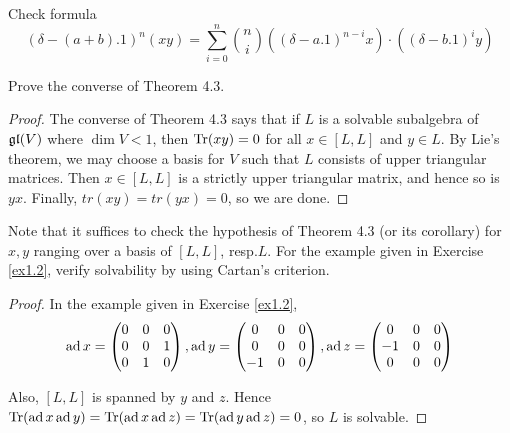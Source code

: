 \begin{ex}
  Check formula
  \begin{equation*}
    (\delta-(a+b).1)^n(xy)=\sum_{i=0}^n \binom{n}{i} ((\delta-a.1)^{n-i}x)\cdot((\delta-b.1)^iy)
  \end{equation*}
\end{ex}

\begin{ex}\label{4.7}
  Prove the converse of Theorem 4.3.
\end{ex}
\begin{proof}
  The converse of Theorem 4.3 says that if $L$ is a solvable subalgebra of $\mathfrak{g}\mathfrak{l}(V)$ where $\dim V < 1$, then $\operatorname{Tr}(xy) = 0$ for all $x \in [L,L]$ and $y \in L$. By Lie's theorem, we may choose a basis for $V$ such that $L$ consists of upper triangular matrices. Then $x \in [L,L]$ is a strictly upper triangular matrix, and hence so is $yx$. Finally, $tr(xy) = tr(yx) = 0$, so we are done.
\end{proof}

\begin{ex}
  Note that it suffices to check the hypothesis of Theorem 4.3 (or its corollary) for $x,y$ ranging over a basis of $[L,L]$, resp.$L$. For the example given in Exercise \ref{ex1.2}, verify solvability by using Cartan's criterion.
\end{ex}
\begin{proof}
  In the example given in Exercise \ref{ex1.2},
  \begin{equation*}
    \operatorname{ad} x = \begin{pmatrix}
              0 & 0 & 0 \\
              0 & 0 & 1 \\
              0 & 1 & 0 \\
            \end{pmatrix},
    \operatorname{ad} y = \begin{pmatrix}
              0 & 0 & 0 \\
              0 & 0 & 0 \\
              -1 & 0 & 0 \\
            \end{pmatrix},
    \operatorname{ad} z =  \begin{pmatrix}
              0 & 0 & 0 \\
              -1 & 0 & 0 \\
              0 & 0 & 0 \\
            \end{pmatrix}
  \end{equation*}

  Also, $[L,L]$ is spanned by $y$ and $z$. Hence $\operatorname{Tr}(\operatorname{ad} x \operatorname{ad} y) = \operatorname{Tr}(\operatorname{ad} x \operatorname{ad} z) = \operatorname{Tr}(\operatorname{ad} y \operatorname{ad} z) = 0$, so $L$ is solvable.
\end{proof}

